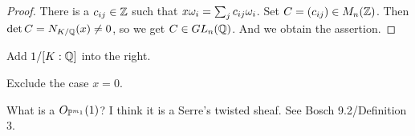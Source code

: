 


\begin{proof}
  There is a $c_{ij} \in \Z$ such that $x \gro_i = \sum_{j} c_{ij} \gro_i$. Set $C= (c_{ij}) \in M_n(\Z)$. Then $\det C = N_{K/\Q}(x) \neq 0 $, so we get $C \in GL_n(\Q)$. And we obtain the assertion.
\end{proof}

\begin{rem}
   Add $1/[K:\Q]$ into the right.
\end{rem}

\begin{rem}
   Exclude the case $x = 0$.
\end{rem}

\begin{rem}
What is a $O_{\P^{m_1} }(1)$? I think it is a Serre's twisted sheaf. See Bosch\cite{Bosch} 9.2/Definition 3. 
\end{rem}
